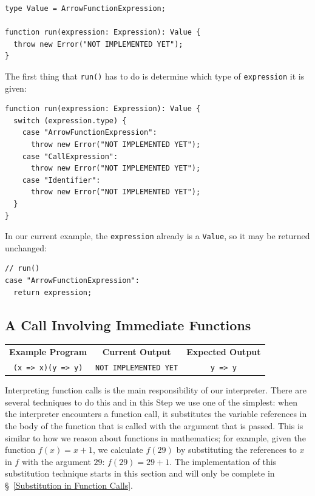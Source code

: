 \documentclass[12pt, oneside]{book}
\begin{document}
\begin{verbatim}
type Value = ArrowFunctionExpression;

function run(expression: Expression): Value {
  throw new Error("NOT IMPLEMENTED YET");
}
\end{verbatim}

The first thing that \texttt{run()} has to do is determine which type of \texttt{expression} it is given:

\begin{verbatim}
function run(expression: Expression): Value {
  switch (expression.type) {
    case "ArrowFunctionExpression":
      throw new Error("NOT IMPLEMENTED YET");
    case "CallExpression":
      throw new Error("NOT IMPLEMENTED YET");
    case "Identifier":
      throw new Error("NOT IMPLEMENTED YET");
  }
}
\end{verbatim}

In our current example, the \texttt{expression} already is a \texttt{Value}, so it may be returned unchanged:

\begin{verbatim}
// run()
case "ArrowFunctionExpression":
  return expression;
\end{verbatim}

\subsection{A Call Involving Immediate Functions}
\label{A Call Involving Immediate Functions}

\begin{center}
\begin{tabular}{c|c|c}
\textbf{Example Program} & \textbf{Current Output} & \textbf{Expected Output} \\
\texttt{(x => x)(y => y)} & \texttt{NOT IMPLEMENTED YET} & \texttt{y => y} \\
\end{tabular}
\end{center}

Interpreting function calls is the main responsibility of our interpreter. There are several techniques to do this and in this Step we use one of the simplest: when the interpreter encounters a function call, it substitutes the variable references in the body of the function that is called with the argument that is passed. This is similar to how we reason about functions in mathematics; for example, given the function $f(x) = x + 1$, we calculate $f(29)$ by substituting the references to $x$ in $f$ with the argument $29$: $f(29) = 29 + 1$. The implementation of this substitution technique starts in this section and will only be complete in §~\ref{Substitution in Function Calls}.
\end{document}

